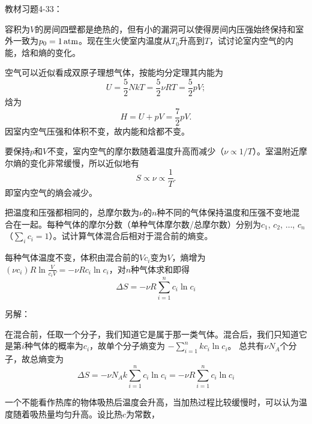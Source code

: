 \documentclass[CJK]{beamer}
\begin{document}
\begin{frame}
  \chtitle{\proid (\sfour)}
  \bch
  教材习题4-33：

  \skipline
  
  容积为$V$的房间四壁都是绝热的，但有小的漏洞可以使得房间内压强始终保持和室外一致为$p_0=1\,\mathrm{atm}$。现在生火使室内温度从$T_0$升高到$T$，试讨论室内空气的内能，焓和熵的变化。
  \ech
\end{frame}


\begin{frame}
  \bch
  空气可以近似看成双原子理想气体，按能均分定理其内能为
  $$U=\frac{5}{2}NkT = \frac{5}{2}\nu R T = \frac{5}{2}pV;$$
  焓为
  $$H = U + pV = \frac{7}{2} pV.$$
  因室内空气压强和体积不变，故内能和焓都不变。

  \skipline

  要保持$p$和$V$不变，室内空气的摩尔数随着温度升高而减少（$\nu\propto 1/T$）。室温附近摩尔熵的变化非常缓慢，所以近似地有
  $$S\propto \nu \propto \frac{1}{T}.$$
  即室内空气的熵会减少。
  \ech
\end{frame}



\begin{frame}
\chtitle{\proid (\sthree)}
\bch
把温度和压强都相同的，总摩尔数为$\nu$的$n$种不同的气体保持温度和压强不变地混合在一起。每种气体的摩尔分数（单种气体摩尔数/总摩尔数）分别为$c_1$, $c_2$, $\ldots$, $c_n$ （$\sum_i c_i = 1$）。试计算气体混合后相对于混合前的熵变。
\ech
\end{frame}

\begin{frame}
  \bch
{\small
每种气体温度不变，体积由混合前的$Vc_i$变为$V$，熵增为$(\nu c_i) R\ln \frac{V}{c_iV} = - \nu R c_i\ln c_i$，对$n$种气体求和即得
$$\Delta S =   -\nu R \sum_{i=1}^n c_i \ln c_i$$}

\skipline

{\scriptsize
另解：

在混合前，任取一个分子，我们知道它是属于那一类气体。混合后，我们只知道它是第$i$种气体的概率为$c_i$，故单个分子熵变为
$-\sum_{i=1}^{n} kc_i\ln c_i $。 总共有$ \nu N_A $个分子，故总熵变为
$$ \Delta S =  -\nu N_A k\sum_{i=1}^n c_i \ln c_i = -\nu R \sum_{i=1}^n c_i \ln c_i$$  
}
\ech
\end{frame}

\begin{frame}
  \bch
  一个不能看作热库的物体吸热后温度会升高，当加热过程比较缓慢时，可以认为温度随着吸热量均匀升高。设比热$c$为常数，
  \ech
\end{frame}
\end{document}
